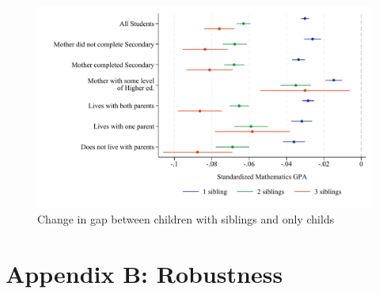 \begin{figure}[htbp]
    \centering
    
        \includegraphics[width=\textwidth]{./FIGURES/TWFE/covid_twfe_D_bysibs_elm_all_gpa_m_adj_Tsiblings_Soldest_4.pdf}
        \caption{Change in gap between children with siblings and only childs}
        \label{fig:fig_appD}

\end{figure}





\newpage
















\clearpage

\setcounter{figure}{0}
\renewcommand\thefigure{B.\arabic{figure}}    

\setcounter{table}{0}
\renewcommand{\thetable}{B.\arabic{table}}
\setcounter{subsection}{0}

\section*{Appendix B: Robustness} \label{sec:appB}

